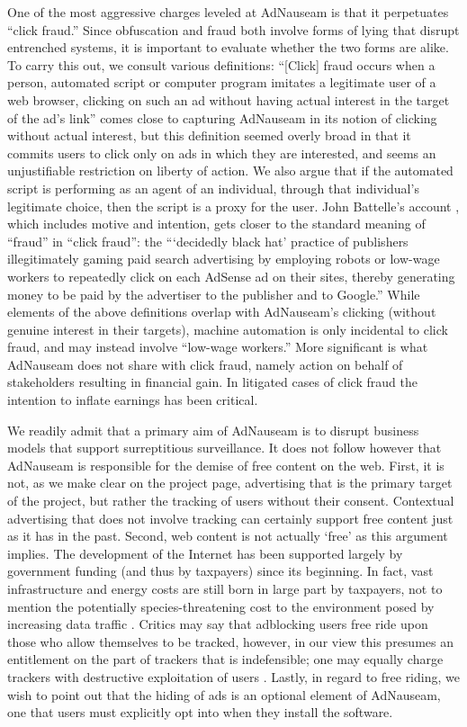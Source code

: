 \documentclass[conference]{IEEEtran}
\begin{document}
One of the most aggressive charges leveled at AdNauseam is that it perpetuates “click fraud.” Since obfuscation and fraud both involve forms of lying that disrupt entrenched systems, it is important to evaluate whether the two forms are alike. To carry this out, we consult various definitions: “[Click] fraud occurs when a person, automated script or computer program imitates a legitimate user of a web browser, clicking on such an ad without having actual interest in the target of the ad's link” \cite{Liu} comes close to capturing AdNauseam in its notion of clicking without actual interest, but this definition seemed overly broad in that it commits users to click only on ads in which they are interested, and seems an unjustifiable restriction on liberty of action. We also argue that if the automated script is performing as an agent of an individual, through that individual's legitimate choice, then the script is a proxy for the user. John Battelle's account \cite{Battelle}, which includes motive and intention, gets closer to the standard meaning of “fraud” in “click fraud”: the “‘decidedly black hat’ practice of publishers illegitimately gaming paid search advertising by employing robots or low-wage workers to repeatedly click on each AdSense ad on their sites, thereby generating money to be paid by the advertiser to the publisher and to Google.” While elements of the above definitions overlap with AdNauseam's clicking (without genuine interest in their targets), machine automation is only incidental to click fraud, and may instead involve “low-wage workers.” More significant is what AdNauseam does not share with click fraud, namely action on behalf of stakeholders resulting in financial gain. In litigated cases of click fraud the intention to inflate earnings has been critical.

We readily admit that a primary aim of AdNauseam is to disrupt business models that support surreptitious surveillance. It does not follow however that AdNauseam is responsible for the demise of free content on the web. First, it is not, as we make clear on the project page, advertising that is the primary target of the project, but rather the tracking of users without their consent. Contextual advertising that does not involve tracking can certainly support free content just as it has in the past. Second, web content is not actually ‘free’ as this argument implies. The development of the Internet has been supported largely by government funding (and thus by taxpayers) since its beginning. In fact, vast infrastructure and energy costs are still born in large part by taxpayers, not to mention the potentially species-threatening cost to the environment posed by increasing data traffic \cite{Hazas}. Critics may say that adblocking users free ride upon those who allow themselves to be tracked, however, in our view this presumes an entitlement on the part of trackers that is indefensible; one may equally charge trackers with destructive exploitation of users \cite{Brunton}. Lastly, in regard to free riding, we wish to point out that the hiding of ads is an optional element of AdNauseam, one that users must explicitly opt into when they install the software.
\end{document}

